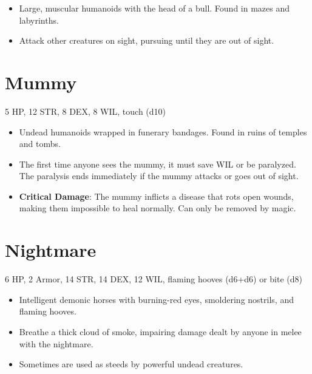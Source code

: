 \documentclass[
  10pt,
  american,
]{article}
\begin{document}
\begin{samepage}
\begin{itemize}
\setlength\itemsep{-.5em}
\item Large, muscular humanoids with the head of a bull. Found in mazes and labyrinths.
\item Attack other creatures on sight, pursuing until they are out of sight.
\end{itemize}
\end{samepage}

\hypertarget{mummy}{%
\section{Mummy}\label{mummy}}

5 HP, 12 STR, 8 DEX, 8 WIL, touch (d10)

\begin{samepage}
\begin{itemize}
\setlength\itemsep{-.5em}
\item Undead humanoids wrapped in funerary bandages. Found in ruins of temples and tombs.
\item The first time anyone sees the mummy, it must save WIL or be paralyzed. The paralysis ends immediately if the mummy attacks or goes out of sight.
\item \textbf{Critical Damage}: The mummy inflicts a disease that rots open wounds, making them impossible to heal normally. Can only be removed by magic.
\end{itemize}
\end{samepage}

\hypertarget{nightmare}{%
\section{Nightmare}\label{nightmare}}

6 HP, 2 Armor, 14 STR, 14 DEX, 12 WIL, flaming hooves (d6+d6) or bite
(d8)

\begin{samepage}
\begin{itemize}
\setlength\itemsep{-.5em}
\item Intelligent demonic horses with burning-red eyes, smoldering nostrils, and flaming hooves.
\item Breathe a thick cloud of smoke, impairing damage dealt by anyone in melee with the nightmare.
\item Sometimes are used as steeds by powerful undead creatures.
\end{itemize}
\end{samepage}
\end{document}
